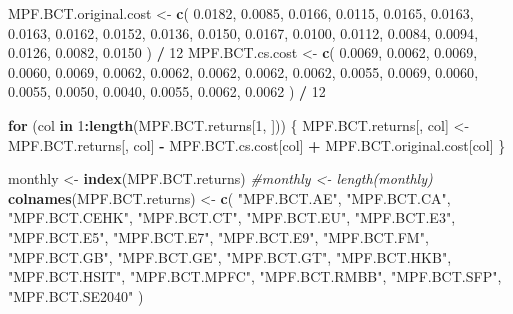 \documentclass[]{article}
\newenvironment{Shaded}{\begin{snugshade}}{\end{snugshade}}
\newcommand{\CommentTok}[1]{\textcolor[rgb]{0.56,0.35,0.01}{\textit{#1}}}
\newcommand{\ControlFlowTok}[1]{\textcolor[rgb]{0.13,0.29,0.53}{\textbf{#1}}}
\newcommand{\DecValTok}[1]{\textcolor[rgb]{0.00,0.00,0.81}{#1}}
\newcommand{\FloatTok}[1]{\textcolor[rgb]{0.00,0.00,0.81}{#1}}
\newcommand{\KeywordTok}[1]{\textcolor[rgb]{0.13,0.29,0.53}{\textbf{#1}}}
\newcommand{\NormalTok}[1]{#1}
\newcommand{\OperatorTok}[1]{\textcolor[rgb]{0.81,0.36,0.00}{\textbf{#1}}}
\newcommand{\StringTok}[1]{\textcolor[rgb]{0.31,0.60,0.02}{#1}}
\begin{document}
\begin{Shaded}
\begin{Highlighting}[]
\NormalTok{MPF.BCT.original.cost <-}
\StringTok{  }\KeywordTok{c}\NormalTok{(}
    \FloatTok{0.0182}\NormalTok{,}
    \FloatTok{0.0085}\NormalTok{,}
    \FloatTok{0.0166}\NormalTok{,}
    \FloatTok{0.0115}\NormalTok{,}
    \FloatTok{0.0165}\NormalTok{,}
    \FloatTok{0.0163}\NormalTok{,}
    \FloatTok{0.0163}\NormalTok{,}
    \FloatTok{0.0162}\NormalTok{,}
    \FloatTok{0.0152}\NormalTok{,}
    \FloatTok{0.0136}\NormalTok{,}
    \FloatTok{0.0150}\NormalTok{,}
    \FloatTok{0.0167}\NormalTok{,}
    \FloatTok{0.0100}\NormalTok{,}
    \FloatTok{0.0112}\NormalTok{,}
    \FloatTok{0.0084}\NormalTok{,}
    \FloatTok{0.0094}\NormalTok{,}
    \FloatTok{0.0126}\NormalTok{,}
    \FloatTok{0.0082}\NormalTok{,}
    \FloatTok{0.0150}
\NormalTok{  ) }\OperatorTok{/}\StringTok{ }\DecValTok{12}
\NormalTok{MPF.BCT.cs.cost <-}
\StringTok{  }\KeywordTok{c}\NormalTok{(}
    \FloatTok{0.0069}\NormalTok{,}
    \FloatTok{0.0062}\NormalTok{,}
    \FloatTok{0.0069}\NormalTok{,}
    \FloatTok{0.0060}\NormalTok{,}
    \FloatTok{0.0069}\NormalTok{,}
    \FloatTok{0.0062}\NormalTok{,}
    \FloatTok{0.0062}\NormalTok{,}
    \FloatTok{0.0062}\NormalTok{,}
    \FloatTok{0.0062}\NormalTok{,}
    \FloatTok{0.0062}\NormalTok{,}
    \FloatTok{0.0055}\NormalTok{,}
    \FloatTok{0.0069}\NormalTok{,}
    \FloatTok{0.0060}\NormalTok{,}
    \FloatTok{0.0055}\NormalTok{,}
    \FloatTok{0.0050}\NormalTok{,}
    \FloatTok{0.0040}\NormalTok{,}
    \FloatTok{0.0055}\NormalTok{,}
    \FloatTok{0.0062}\NormalTok{,}
    \FloatTok{0.0062}
\NormalTok{  ) }\OperatorTok{/}\StringTok{ }\DecValTok{12}

\ControlFlowTok{for}\NormalTok{ (col }\ControlFlowTok{in} \DecValTok{1}\OperatorTok{:}\KeywordTok{length}\NormalTok{(MPF.BCT.returns[}\DecValTok{1}\NormalTok{, ])) \{}
\NormalTok{  MPF.BCT.returns[, col] <-}
\StringTok{    }\NormalTok{MPF.BCT.returns[, col] }\OperatorTok{-}\StringTok{ }\NormalTok{MPF.BCT.cs.cost[col] }\OperatorTok{+}\StringTok{ }\NormalTok{MPF.BCT.original.cost[col]}
\NormalTok{\}}


\NormalTok{monthly <-}\StringTok{ }\KeywordTok{index}\NormalTok{(MPF.BCT.returns)}
\CommentTok{#monthly <- length(monthly)}
\KeywordTok{colnames}\NormalTok{(MPF.BCT.returns) <-}
\StringTok{  }\KeywordTok{c}\NormalTok{(}
    \StringTok{"MPF.BCT.AE"}\NormalTok{,}
    \StringTok{"MPF.BCT.CA"}\NormalTok{,}
    \StringTok{"MPF.BCT.CEHK"}\NormalTok{,}
    \StringTok{"MPF.BCT.CT"}\NormalTok{,}
    \StringTok{"MPF.BCT.EU"}\NormalTok{,}
    \StringTok{"MPF.BCT.E3"}\NormalTok{,}
    \StringTok{"MPF.BCT.E5"}\NormalTok{,}
    \StringTok{"MPF.BCT.E7"}\NormalTok{,}
    \StringTok{"MPF.BCT.E9"}\NormalTok{,}
    \StringTok{"MPF.BCT.FM"}\NormalTok{,}
    \StringTok{"MPF.BCT.GB"}\NormalTok{,}
    \StringTok{"MPF.BCT.GE"}\NormalTok{,}
    \StringTok{"MPF.BCT.GT"}\NormalTok{,}
    \StringTok{"MPF.BCT.HKB"}\NormalTok{,}
    \StringTok{"MPF.BCT.HSIT"}\NormalTok{,}
    \StringTok{"MPF.BCT.MPFC"}\NormalTok{,}
    \StringTok{"MPF.BCT.RMBB"}\NormalTok{,}
    \StringTok{"MPF.BCT.SFP"}\NormalTok{,}
    \StringTok{"MPF.BCT.SE2040"}
\NormalTok{  )}


\end{Highlighting}
\end{Shaded}
\end{document}
